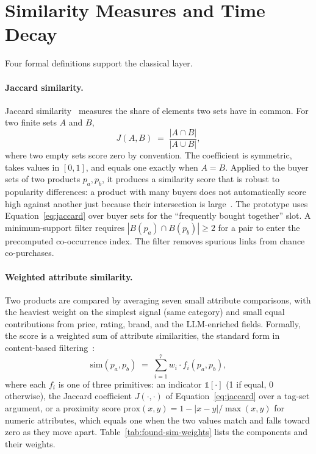 \section{Similarity Measures and Time Decay}
\label{sec:found-similarity}

Four formal definitions support the classical layer.

\paragraph{Jaccard similarity.} Jaccard
similarity~\cite{Jaccard1912} measures the share of elements two
sets have in common. For two finite sets $A$ and $B$,
\begin{equation}
  J(A, B) \;=\; \frac{|A \cap B|}{|A \cup B|},
  \label{eq:jaccard}
\end{equation}
where two empty sets score zero by convention. The coefficient
is symmetric, takes values in $[0, 1]$, and equals one exactly
when $A = B$.
Applied to the buyer sets of two products $p_a, p_b$, it produces
a similarity score that is robust to popularity differences: a
product with many buyers does not automatically score high
against another just because their intersection is
large~\cite{ComprehensiveRecSys2024}. The
prototype uses Equation~\ref{eq:jaccard} over buyer sets for the
``frequently bought together'' slot. A minimum-support filter
requires $|B(p_a) \cap B(p_b)| \ge 2$ for a pair to enter the
precomputed co-occurrence index. The filter removes spurious
links from chance co-purchases.

\paragraph{Weighted attribute similarity.} Two products are
compared by averaging seven small attribute comparisons, with the
heaviest weight on the simplest signal (same category) and small
equal contributions from price, rating, brand, and the
LLM-enriched fields. Formally, the score is a weighted sum of
attribute similarities, the standard form in content-based
filtering~\cite{ComprehensiveRecSys2024}:
\begin{equation}
  \mathrm{sim}(p_a, p_b) \;=\; \sum_{i=1}^{7} w_i \cdot f_i(p_a, p_b),
  \label{eq:attr-sim}
\end{equation}
where each $f_i$ is one of three primitives: an indicator
$\mathbb{1}[\cdot]$ (1 if equal, 0 otherwise), the Jaccard
coefficient $J(\cdot, \cdot)$ of Equation~\ref{eq:jaccard} over a
tag-set argument, or a
proximity score $\mathrm{prox}(x, y) = 1 - |x-y|/\max(x,y)$ for
numeric attributes, which equals one when the two values match
and falls toward zero as they move apart.
Table~\ref{tab:found-sim-weights} lists the
components and their weights.

